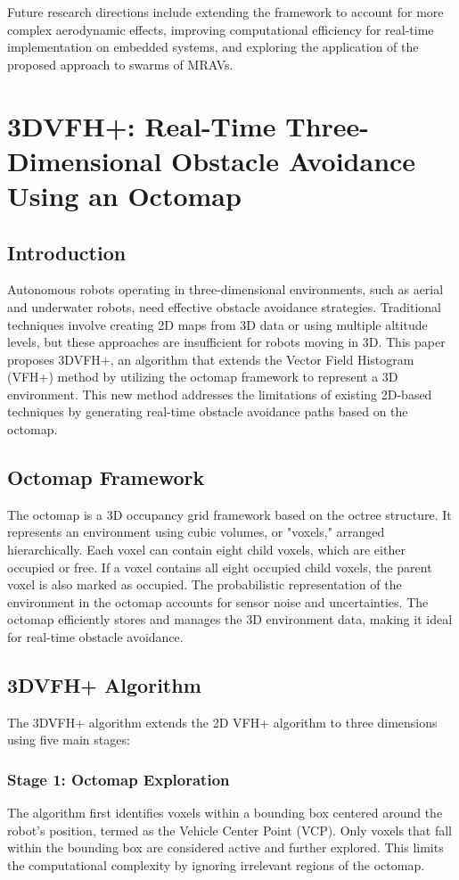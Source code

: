 \documentclass[a4paper,12pt]{article}
\begin{document}
Future research directions include extending the framework to account for more complex aerodynamic effects, improving computational efficiency for real-time implementation on embedded systems, and exploring the application of the proposed approach to swarms of MRAVs.

\clearpage

\section{3DVFH+: Real-Time Three-Dimensional Obstacle Avoidance Using an Octomap}
\subsection{Introduction}
Autonomous robots operating in three-dimensional environments, such as aerial and underwater robots, need effective obstacle avoidance strategies. Traditional techniques involve creating 2D maps from 3D data or using multiple altitude levels, but these approaches are insufficient for robots moving in 3D. This paper proposes 3DVFH+, an algorithm that extends the Vector Field Histogram (VFH+) method by utilizing the octomap framework to represent a 3D environment. This new method addresses the limitations of existing 2D-based techniques by generating real-time obstacle avoidance paths based on the octomap.

\subsection{Octomap Framework}
The octomap is a 3D occupancy grid framework based on the octree structure. It represents an environment using cubic volumes, or "voxels," arranged hierarchically. Each voxel can contain eight child voxels, which are either occupied or free. If a voxel contains all eight occupied child voxels, the parent voxel is also marked as occupied. The probabilistic representation of the environment in the octomap accounts for sensor noise and uncertainties. The octomap efficiently stores and manages the 3D environment data, making it ideal for real-time obstacle avoidance.

\subsection{3DVFH+ Algorithm}
The 3DVFH+ algorithm extends the 2D VFH+ algorithm to three dimensions using five main stages:

\subsubsection{Stage 1: Octomap Exploration}
The algorithm first identifies voxels within a bounding box centered around the robot's position, termed as the Vehicle Center Point (VCP). Only voxels that fall within the bounding box are considered active and further explored. This limits the computational complexity by ignoring irrelevant regions of the octomap.
\end{document}
